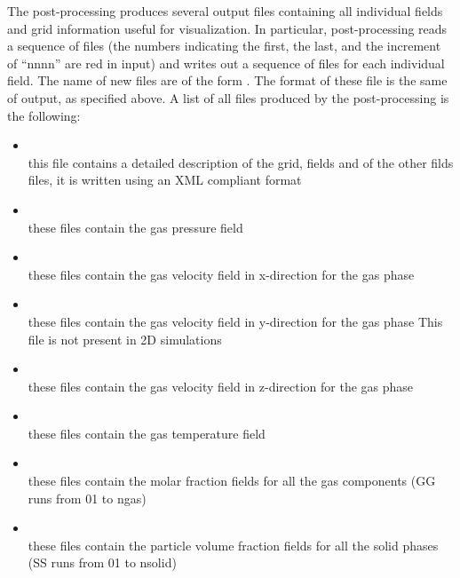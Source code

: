 The post-processing produces several output files
containing all individual fields and grid information useful
for visualization.
In particular, post-processing  reads a sequence
of  files (the numbers indicating the first, the last, and
the increment of ``nnnn'' are red in input)
and writes out a sequence of files for each individual field.
The name of new files are of the form .
The format of these file is the same of output, as specified above.
A list of all files produced by the post-processing is the following:

\begin{itemize}

\item {}  \\
      this file contains a detailed description of the grid, fields 
      and of the other filds files, it is written using an XML compliant format

\item {} \\
      these files contain the gas pressure field 

\item {} \\
      these files contain the gas velocity field in x-direction
      for the gas phase

\item {} \\
      these files contain the gas velocity field in y-direction
      for the gas phase
      This file is not present in 2D simulations

\item {} \\
      these files contain the gas velocity field in z-direction
for the gas phase

\item {} \\
      these files contain the gas temperature field 

\item {} \\
      these files contain the molar fraction fields for all the gas 
      components (GG runs from 01 to ngas) 

\item {} \\
      these files contain the particle volume fraction fields for all the 
      solid phases (SS runs from 01 to nsolid) 


\end{itemize}
